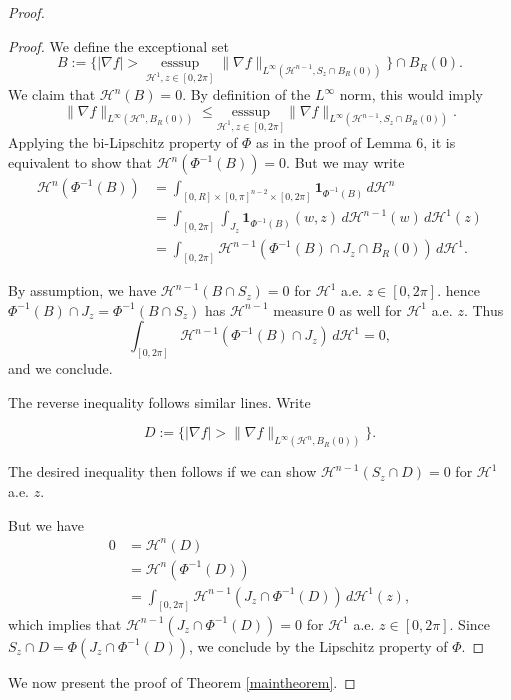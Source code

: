 \documentclass{article}
\DeclareMathOperator{\esssup}{esssup}
\begin{document}
\begin{proof}
\begin{proof}
\noindent We define the exceptional set
$$B := \{|\nabla f| > \underset{ \mathcal H^1, z \in [0, 2\pi]}{\esssup} \|\nabla f\|_{L^\infty (\mathcal H^{n-1}, S_z \cap B_R(0))}\} \cap B_R(0).$$
\noindent We claim that $\mathcal H^n (B) = 0$. By definition of the $L^\infty$ norm, this would imply 
$$\|\nabla f\|_{L^\infty (\mathcal H^n, B_R(0))} \leq \underset{ \mathcal H^1, z \in [0, 2\pi]}{\text{esssup}} \|\nabla f\|_{L^\infty (\mathcal H^{n-1}, S_z \cap B_R(0))}.$$
\noindent Applying the bi-Lipschitz property of $\Phi$ as in the proof of Lemma 6, it is equivalent to show that $\mathcal H^{n} (\Phi^{-1}(B)) = 0$. But we may write
$$\begin{aligned}\mathcal H^n (\Phi^{-1}(B)) & = \int_{[0, R] \times [0, \pi]^{n-2} \times [0, 2\pi]} \mathbf 1_{\Phi^{-1}(B)} \, d\mathcal H^n \\
&= \int_{[0, 2\pi]} \int_{J_z} \mathbf 1_{\Phi^{-1}(B)} (w, z) \, d\mathcal H^{n-1} (w) \, d\mathcal H^1 (z) \\ 
& = \int_{[0, 2\pi]}\mathcal H^{n-1}(\Phi^{-1}(B) \cap J_z \cap B_R(0)) \, d\mathcal H^1.\end{aligned}$$

\noindent By assumption, we have $\mathcal H^{n-1}(B \cap S_z) = 0$ for $\mathcal H^1$ a.e. $z \in [0, 2\pi]$. hence $\Phi^{-1}(B) \cap J_z = \Phi^{-1} (B \cap S_z)$ has $\mathcal H^{n-1}$ measure $0$ as well for $\mathcal H^1$ a.e. $z$. Thus
$$\int_{[0, 2\pi]}\mathcal H^{n-1}(\Phi^{-1}(B) \cap J_z) \, d\mathcal H^1 = 0,$$
\noindent and we conclude.

\noindent The reverse inequality follows similar lines. Write 

$$D := \{|\nabla f| > \|\nabla f\|_{L^\infty (\mathcal H^n, B_R(0))}\}.$$

\noindent The desired inequality then follows if we can show $\mathcal H^{n-1} (S_z \cap D) = 0$ for $\mathcal H^1$ a.e. $z$.

\noindent But we have
$$\begin{aligned}0 &= \mathcal H^n (D) \\
&= \mathcal H^n (\Phi^{-1}(D))\\
&= \int_{[0, 2\pi]} \mathcal H^{n-1}(J_z \cap \Phi^{-1}(D)) \, d\mathcal H^1 (z),\end{aligned}$$
\noindent which implies that  $\mathcal H^{n-1}(J_z \cap \Phi^{-1}(D)) = 0$ for $\mathcal H^1$ a.e. $z \in [0, 2\pi]$. Since $S_z \cap D = \Phi( J_z \cap \Phi^{-1}(D))$, we conclude by the Lipschitz property of $\Phi$.
\end{proof}

We now present the proof of Theorem \ref{maintheorem}.

\end{proof}
\end{document}
